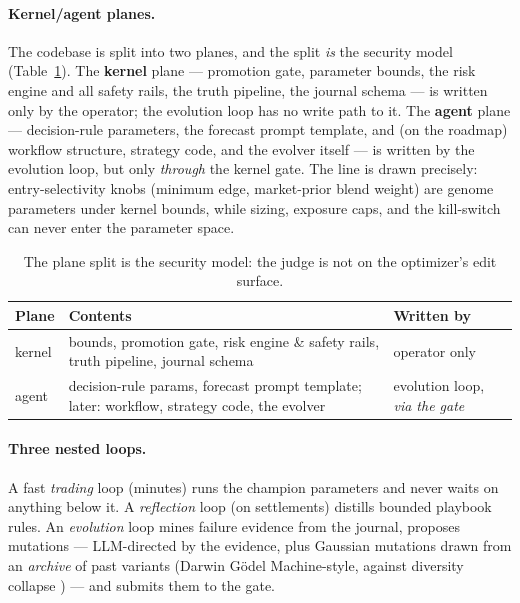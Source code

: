 \documentclass[10pt,twocolumn]{article}
\begin{document}
\paragraph{Kernel/agent planes.} The codebase is split into two planes, and the
split \emph{is} the security model (Table~\ref{tab:planes}). The \textbf{kernel}
plane --- promotion gate, parameter bounds, the risk engine and all safety rails,
the truth pipeline, the journal schema --- is written only by the operator; the
evolution loop has no write path to it. The \textbf{agent} plane --- decision-rule
parameters, the forecast prompt template, and (on the roadmap) workflow
structure, strategy code, and the evolver itself --- is written by the evolution
loop, but only \emph{through} the kernel gate. The line is drawn precisely:
entry-selectivity knobs (minimum edge, market-prior blend weight) are genome
parameters under kernel bounds, while sizing, exposure caps, and the kill-switch
can never enter the parameter space.

\begin{table}[t]
\centering
\small
\begin{tabular}{@{}p{1.4cm}p{4.2cm}p{1.7cm}@{}}
\toprule
\textbf{Plane} & \textbf{Contents} & \textbf{Written by} \\
\midrule
kernel & bounds, promotion gate, risk engine \& safety rails, truth pipeline, journal schema & operator only \\
agent & decision-rule params, forecast prompt template; later: workflow, strategy code, the evolver & evolution loop, \emph{via the gate} \\
\bottomrule
\end{tabular}
\caption{The plane split is the security model: the judge is not on the
optimizer's edit surface.}
\label{tab:planes}
\end{table}

\paragraph{Three nested loops.} A fast \emph{trading} loop (minutes) runs the
champion parameters and never waits on anything below it. A \emph{reflection}
loop (on settlements) distills bounded playbook rules. An \emph{evolution} loop
mines failure evidence from the journal, proposes mutations --- LLM-directed by
the evidence, plus Gaussian mutations drawn from an \emph{archive} of past
variants (Darwin Gödel Machine-style, against diversity collapse
\cite{dgm}) --- and submits them to the gate.
\end{document}
